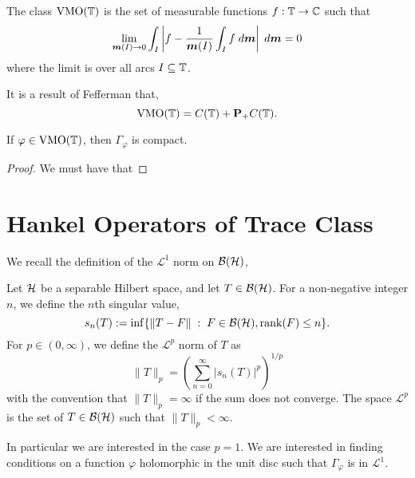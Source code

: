 \documentclass{unswmaths}
\begin{document}
\begin{proposition}
    The class $\operatorname{VMO}(\mathbb{T})$ is the set of measurable functions $f:\mathbb{T}\rightarrow\mathbb{C}$
    such that
    \begin{equation*}
        \lim_{\boldsymbol{m}(I)\rightarrow0} \int_I \left|f-\frac{1}{\boldsymbol{m}(I)}\int_I f\;d\boldsymbol{m}\right|\;d\boldsymbol{m} = 0
    \end{equation*}
    where the limit is over all arcs $I \subseteq \mathbb{T}$. 
    
    It is a result of Fefferman \cite{fefferman} that,
    \begin{equation*}
        \operatorname{VMO}(\mathbb{T}) = C(\mathbb{T})+\mathbf{P}_+C(\mathbb{T}).
    \end{equation*}
\end{proposition}   

\begin{corollary}
    If $\varphi \in \operatorname{VMO}(\mathbb{T})$, then $\Gamma_\varphi$ is compact.
\end{corollary}
\begin{proof}
    We must have that 
\end{proof} 

\section{Hankel Operators of Trace Class}
We recall the definition of the $\mathcal{L}^1$ norm on $\mathcal{B}(\mathcal{H})$,
\begin{definition}
    Let $\mathcal{H}$ be a separable Hilbert space, and let $T \in \mathcal{B}(\mathcal{H})$. 
    For a non-negative integer $n$, we define the $n$th singular value,
    \begin{equation*}
        s_n(T) := \inf\{\|T-F\| \;:\;F \in \mathcal{B}(\mathcal{H}),\operatorname{rank}(F) \leq n\}.
    \end{equation*}
    For $p \in (0,\infty)$, we define the $\mathcal{L}^p$ norm of $T$
    as
    \begin{equation*}
        \|T\|_p = \left(\sum_{n=0}^\infty |s_n(T)|^p\right)^{1/p}
    \end{equation*}
    with the convention that $\|T\|_p = \infty$ if the sum does not
    converge. The space $\mathcal{L}^p$ is the set of $T \in \mathcal{B}(\mathcal{H})$
    such that $\|T\|_p < \infty$.
\end{definition}



In particular we are interested in the case $p = 1$. We are interested
in finding conditions on a function $\varphi$ holomorphic in the unit disc
such that $\Gamma_\varphi$ is in $\mathcal{L}^1$. 
\end{document}
